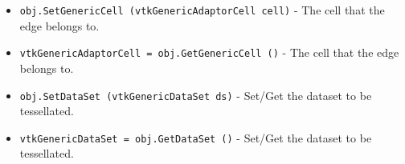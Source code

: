 \begin{itemize}
\item  \verb|obj.SetGenericCell (vtkGenericAdaptorCell cell)| -  The cell that the edge belongs to.

\item  \verb|vtkGenericAdaptorCell = obj.GetGenericCell ()| -  The cell that the edge belongs to.

\item  \verb|obj.SetDataSet (vtkGenericDataSet ds)| -  Set/Get the dataset to be tessellated.

\item  \verb|vtkGenericDataSet = obj.GetDataSet ()| -  Set/Get the dataset to be tessellated.

\end{itemize}
